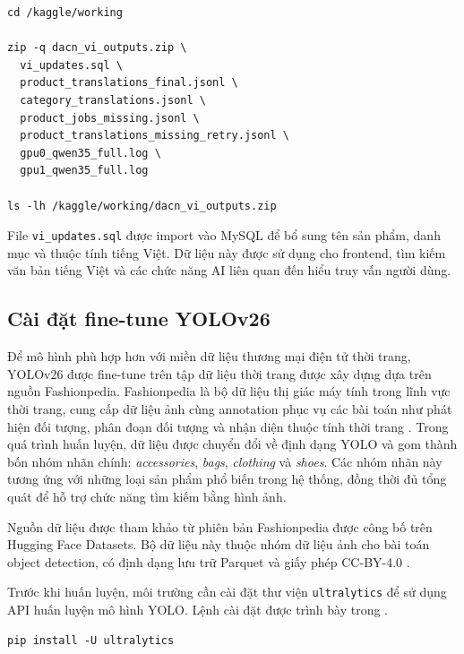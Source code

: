 \begin{lstlisting}[style=terminal,caption={Đóng gói kết quả đầu ra của pipeline Việt hóa dữ liệu},label={lst:vi-zip-output}]
cd /kaggle/working

zip -q dacn_vi_outputs.zip \
  vi_updates.sql \
  product_translations_final.jsonl \
  category_translations.jsonl \
  product_jobs_missing.jsonl \
  product_translations_missing_retry.jsonl \
  gpu0_qwen35_full.log \
  gpu1_qwen35_full.log

ls -lh /kaggle/working/dacn_vi_outputs.zip
\end{lstlisting}

File \texttt{vi\_updates.sql} được import vào MySQL để bổ sung tên sản phẩm, danh mục và thuộc tính tiếng Việt. Dữ liệu này được sử dụng cho frontend, tìm kiếm văn bản tiếng Việt và các chức năng AI liên quan đến hiểu truy vấn người dùng.
\subsection{Cài đặt fine-tune YOLOv26}
Để mô hình phù hợp hơn với miền dữ liệu thương mại điện tử thời trang, YOLOv26 được fine-tune trên tập dữ liệu thời trang được xây dựng dựa trên nguồn Fashionpedia. Fashionpedia là bộ dữ liệu thị giác máy tính trong lĩnh vực thời trang, cung cấp dữ liệu ảnh cùng annotation phục vụ các bài toán như phát hiện đối tượng, phân đoạn đối tượng và nhận diện thuộc tính thời trang \parencite{jia2020fashionpedia}. Trong quá trình huấn luyện, dữ liệu được chuyển đổi về định dạng YOLO và gom thành bốn nhóm nhãn chính: \textit{accessories}, \textit{bags}, \textit{clothing} và \textit{shoes}. Các nhóm nhãn này tương ứng với những loại sản phẩm phổ biến trong hệ thống, đồng thời đủ tổng quát để hỗ trợ chức năng tìm kiếm bằng hình ảnh.

Nguồn dữ liệu được tham khảo từ phiên bản Fashionpedia được công bố trên Hugging Face Datasets. Bộ dữ liệu này thuộc nhóm dữ liệu ảnh cho bài toán object detection, có định dạng lưu trữ Parquet và giấy phép CC-BY-4.0 \parencite{huggingfaceFashionpedia}.



Trước khi huấn luyện, môi trường cần cài đặt thư viện \texttt{ultralytics} để sử dụng API huấn luyện mô hình YOLO. Lệnh cài đặt được trình bày trong .

\begin{lstlisting}[style=terminal,caption={Cài đặt thư viện Ultralytics phục vụ fine-tune YOLOv26},label={lst:install-ultralytics}]
pip install -U ultralytics
\end{lstlisting}

